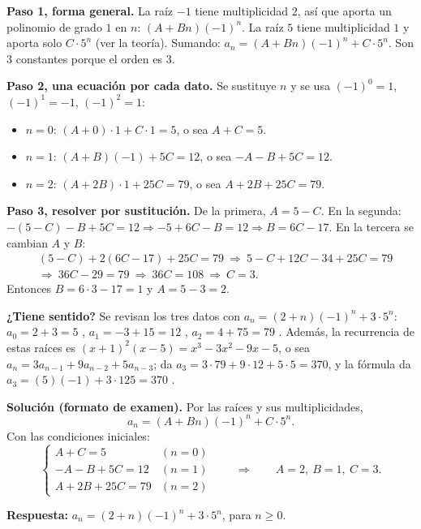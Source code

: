 \documentclass[11pt]{article}
\begin{document}
\begin{explica}
\textbf{Paso 1, forma general.} La raíz $-1$ tiene multiplicidad $2$, así que aporta un polinomio de grado $1$ en $n$: $(A+Bn)(-1)^n$. La raíz $5$ tiene multiplicidad $1$ y aporta solo $C\cdot5^n$ (ver la teoría). Sumando: $a_n=(A+Bn)(-1)^n+C\cdot5^n$. Son $3$ constantes porque el orden es $3$.

\textbf{Paso 2, una ecuación por cada dato.} Se sustituye $n$ y se usa $(-1)^0=1$, $(-1)^1=-1$, $(-1)^2=1$:
\begin{itemize}[leftmargin=1.2em,itemsep=0pt]
\item $n=0$: $(A+0)\cdot1+C\cdot1=5$, o sea $A+C=5$.
\item $n=1$: $(A+B)(-1)+5C=12$, o sea $-A-B+5C=12$.
\item $n=2$: $(A+2B)\cdot1+25C=79$, o sea $A+2B+25C=79$.
\end{itemize}

\textbf{Paso 3, resolver por sustitución.} De la primera, $A=5-C$. En la segunda: $-(5-C)-B+5C=12\Rightarrow -5+6C-B=12\Rightarrow B=6C-17$. En la tercera se cambian $A$ y $B$:
\begin{align*}
&(5-C)+2(6C-17)+25C=79\ \Rightarrow\ 5-C+12C-34+25C=79\\
&\Rightarrow\ 36C-29=79\ \Rightarrow\ 36C=108\ \Rightarrow\ C=3.
\end{align*}
Entonces $B=6\cdot3-17=1$ y $A=5-3=2$.

\textbf{¿Tiene sentido?} Se revisan los tres datos con $a_n=(2+n)(-1)^n+3\cdot5^n$:
$a_0=2+3=5$ \checkmark, $a_1=-3+15=12$ \checkmark, $a_2=4+75=79$ \checkmark. Además, la recurrencia de estas raíces es $(x+1)^2(x-5)=x^3-3x^2-9x-5$, o sea $a_n=3a_{n-1}+9a_{n-2}+5a_{n-3}$; da $a_3=3\cdot79+9\cdot12+5\cdot5=370$, y la fórmula da $a_3=(5)(-1)+3\cdot125=370$ \checkmark.
\end{explica}

\textbf{Solución (formato de examen).} Por las raíces y sus multiplicidades,
\[a_n=(A+Bn)(-1)^n+C\cdot5^n.\]
Con las condiciones iniciales:
\[\begin{cases} A+C=5 & (n=0)\\ -A-B+5C=12 & (n=1)\\ A+2B+25C=79 & (n=2)\end{cases}\qquad\Longrightarrow\qquad A=2,\ B=1,\ C=3.\]

\textbf{Respuesta:} $a_n=(2+n)(-1)^n+3\cdot 5^n$, para $n\ge0$.

\clearpage
\end{document}
